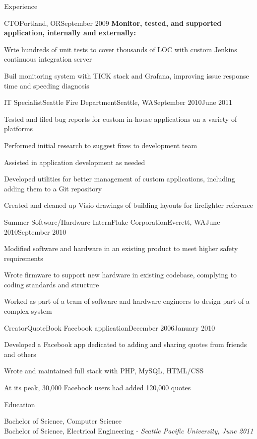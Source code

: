 \documentclass[letterpaper,10pt]{article}
\let\pt\pasttense
\let\anon\anonno
\begin{document}
\begin{res_section}{Experience}
\begin{res_experienceitem}{CTO}{\anon{SERPs.com}{SaaSCo}}{Portland, OR}{September 2009}{{\pt[Present]{March 2017}}}
  \nonitem \textbf{Monitor\pt{ed}, tested, and supported application, internally and externally:}
  \item Wr\pt[i]{o}te hundreds of unit tests to cover thousands of LOC with custom Jenkins continuous integration server
  \item Buil\pt[d]{t} monitoring system with TICK stack and Grafana, improving issue response time and speeding diagnosis
\end{res_experienceitem}
\begin{res_experienceitem}{IT Specialist}{Seattle Fire Department}{Seattle, WA}{September 2010}{June 2011}
  \item Tested and filed bug reports for custom in-house applications on a variety of platforms
  \item Performed initial research to suggest fixes to development team
  \item Assisted in application development as needed
  \item Developed utilities for better management of custom applications, including adding them to a Git repository
  \item Created and cleaned up Visio drawings of building layouts for firefighter reference
\end{res_experienceitem}
\begin{res_experienceitem}{Summer Software/Hardware Intern}{Fluke Corporation}{Everett, WA}{June 2010}{September 2010}
  \item Modified software and hardware in an existing product to meet higher safety requirements
  \item Wrote firmware to support new hardware in existing codebase, complying to coding standards and structure
  \item Worked as part of a team of software and hardware engineers to design part of a complex system
\end{res_experienceitem}
\begin{res_experienceitem}{Creator}{QuoteBook Facebook application}{}{December 2006}{January 2010}
  \item Developed a Facebook app dedicated to adding and sharing quotes from friends and others
  \item Wrote and maintained full stack with PHP, MySQL, HTML/CSS
  \item At its peak, 30,000 Facebook users had added 120,000 quotes
\end{res_experienceitem}
\end{res_section}

\begin{res_section}{Education}
\begin{res_content}{Bachelor of Science, Computer Science\\
Bachelor of Science, Electrical Engineering - \em{Seattle Pacific University, June 2011}
}
\end{res_content}
\end{res_section}
\end{document}
